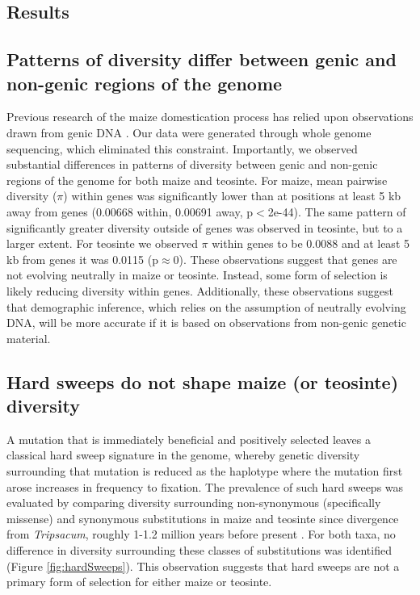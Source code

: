\documentclass{pnastwo}
\begin{document}
\begin{article}
\section{Results}
\subsection{Patterns of diversity differ between genic and
  non-genic regions of the genome}
Previous research of the maize domestication process has relied upon
observations drawn from genic DNA \cite{wright2005,wang1999,eyre1998}. Our data were generated through whole genome sequencing,
which eliminated this constraint. Importantly, we observed substantial
differences in patterns of diversity between genic and non-genic regions
of the genome for both maize and teosinte. For maize, mean pairwise
diversity ($\pi$) within genes was significantly lower than at
positions at least 5 kb away from genes (0.00668 within, 0.00691 away, p$<$2e-44). The same
pattern of significantly greater diversity outside of genes was observed in
teosinte, but to a larger extent. For teosinte we observed $\pi$
within genes to be 0.0088 and at least 5 kb from genes it was 0.0115
(p$\approx$0). These observations suggest that genes are not evolving
neutrally in maize or teosinte. Instead, some form of selection is likely
reducing diversity within genes. Additionally, these observations
suggest that demographic inference, which relies on the assumption of
neutrally evolving DNA, will be more accurate if it is based on
observations from non-genic genetic material.

\subsection{Hard sweeps do not shape maize (or teosinte) diversity}
A mutation that is immediately beneficial and positively selected leaves a classical hard
sweep signature in the genome, whereby genetic diversity surrounding
that mutation is reduced as the haplotype where the mutation first
arose increases in frequency to fixation. The prevalence of such hard
sweeps was evaluated by comparing diversity
surrounding non-synonymous (specifically missense) and synonymous substitutions in maize and
teosinte since divergence from \emph{Tripsacum}, roughly 1-1.2 million years before
present \cite{ross2009}. For both taxa, no difference in diversity
surrounding these classes of substitutions was identified (Figure
\ref{fig:hardSweeps}). This observation suggests that hard sweeps are not a primary form of
selection for either maize or teosinte.


\end{article}
\end{document}
